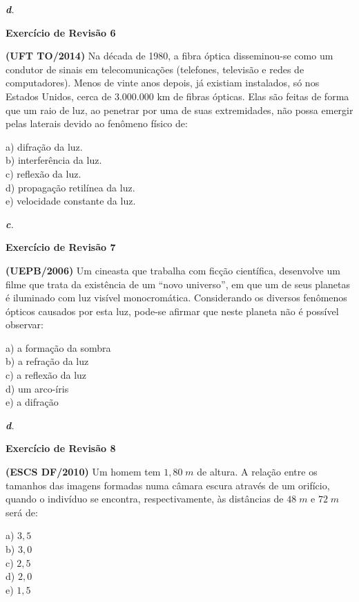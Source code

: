 \documentclass[11pt,twocolumn,oneside]{article}
\newenvironment{resposta*}
  {\bf Resposta:\\ }
  {}
\begin{document}
\begin{resposta*}
{\it \textbf{d}.}
\end{resposta*}

\textbf{Exercício de Revisão 6}


\textbf{(UFT TO/2014)} Na década de 1980, a fibra óptica disseminou-se como um condutor de sinais em telecomunicações (telefones, televisão e redes de computadores). Menos de vinte anos depois, já existiam instalados, só nos Estados Unidos, cerca de 3.000.000 km de fibras ópticas. Elas são feitas de forma que um raio de luz, ao penetrar por uma de suas extremidades, não possa emergir pelas laterais devido ao fenômeno físico de:


a)	difração da luz. \\
b)	interferência da luz. \\
c)	reflexão da luz. \\
d)	propagação retilínea da luz. \\
e)	velocidade constante da luz.


\begin{resposta*}
{\it \textbf{c}.}
\end{resposta*}

\textbf{Exercício de Revisão 7}


\textbf{(UEPB/2006)} Um cineasta que trabalha com ficção científica, desenvolve um filme que trata da existência de um “novo universo”, em que um de seus planetas é iluminado com luz visível monocromática.  Considerando os diversos fenômenos ópticos causados por esta luz, pode-se afirmar que neste planeta não é possível observar:


a)	a formação da sombra \\
b)	a refração da luz \\
c)	a reflexão da luz \\
d)	um arco-íris \\
e)	a difração


\begin{resposta*}
{\it \textbf{d}.}
\end{resposta*}

\textbf{Exercício de Revisão 8}


\textbf{(ESCS DF/2010)} Um homem tem $1,80\;m$ de altura. A relação entre os tamanhos das imagens formadas numa câmara escura através de um orifício, quando o indivíduo se encontra, respectivamente, às distâncias de $48\;m$ e $72\;m$ será de:


a)	$3,5$ \\
b)	$3,0$ \\
c)	$2,5$ \\
d)	$2,0$ \\
e)	$1,5$
\end{document}
